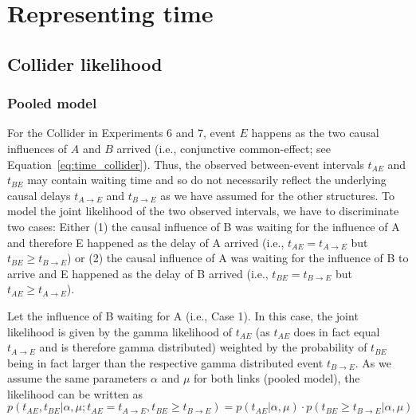

\chapter{Representing time} %

\label{app:b} %




\section{Collider likelihood}

\subsection*{Pooled model}
For the Collider in Experiments 6 and 7, event $E$ happens as the two causal influences of $A$ and $B$ arrived (i.e., conjunctive common-effect; see Equation~\ref{eq:time_collider}). Thus, the observed between-event intervals $t_{AE}$ and $t_{BE}$ may contain waiting time and so do not necessarily reflect the underlying causal delays $t_{A\rightarrow E}$ and $t_{B\rightarrow E}$ as we have assumed for the other structures. To model the joint likelihood of the two observed intervals, we have to discriminate two cases: Either (1) the causal influence of B was waiting for the influence of A and therefore E happened as the delay of A arrived (i.e., $t_{AE} = t_{A\rightarrow E}$ but $t_{BE} \geq t_{B\rightarrow E}$) or (2) the causal influence of A was waiting for the influence of B to arrive and E happened as the delay of B arrived (i.e., $t_{BE} = t_{B\rightarrow E}$ but $t_{AE} \geq t_{A\rightarrow E}$).

Let the influence of B waiting for A (i.e., Case 1). In this case, the joint likelihood is given by the gamma likelihood of $t_{AE}$ (as $t_{AE}$ does in fact equal $t_{A\rightarrow E}$  and is therefore gamma distributed) weighted by the probability of $t_{BE}$ being in fact larger than the respective gamma distributed event $t_{B\rightarrow E}$. As we assume the same parameters $\alpha$ and $\mu$ for both links (pooled model), the likelihood can be written as
\begin{equation}
p(t_{AE}, t_{BE}|\alpha,\mu; t_{AE} = t_{A\rightarrow E}, t_{BE} \geq t_{B\rightarrow E}) = p(t_{AE}|\alpha,\mu)\cdot  p(t_{BE}\geq t_{B\rightarrow E}|\alpha,\mu)
\end{equation}

